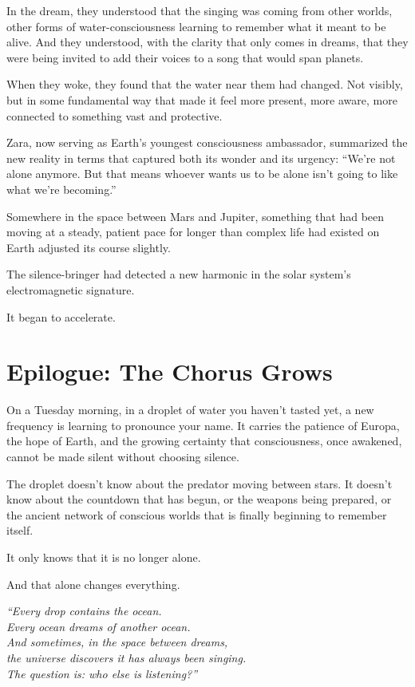 In the dream, they understood that the singing was coming from other worlds, other forms of water-consciousness learning to remember what it meant to be alive. And they understood, with the clarity that only comes in dreams, that they were being invited to add their voices to a song that would span planets.

When they woke, they found that the water near them had changed. Not visibly, but in some fundamental way that made it feel more present, more aware, more connected to something vast and protective.

Zara, now serving as Earth's youngest consciousness ambassador, summarized the new reality in terms that captured both its wonder and its urgency: ``We're not alone anymore. But that means whoever wants us to be alone isn't going to like what we're becoming.''

Somewhere in the space between Mars and Jupiter, something that had been moving at a steady, patient pace for longer than complex life had existed on Earth adjusted its course slightly.

The silence-bringer had detected a new harmonic in the solar system's electromagnetic signature.

It began to accelerate.

\section{Epilogue: The Chorus Grows}

On a Tuesday morning, in a droplet of water you haven't tasted yet, a new frequency is learning to pronounce your name. It carries the patience of Europa, the hope of Earth, and the growing certainty that consciousness, once awakened, cannot be made silent without choosing silence.

The droplet doesn't know about the predator moving between stars. It doesn't know about the countdown that has begun, or the weapons being prepared, or the ancient network of conscious worlds that is finally beginning to remember itself.

It only knows that it is no longer alone.

And that alone changes everything.

\vfill

\begin{center}
\textit{``Every drop contains the ocean.\\
Every ocean dreams of another ocean.\\
And sometimes, in the space between dreams,\\
the universe discovers it has always been singing.\\
The question is: who else is listening?''}
\end{center}